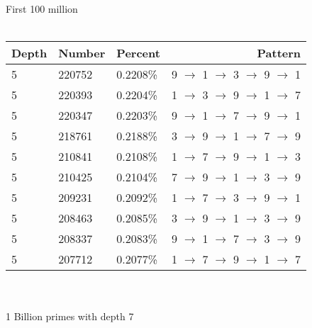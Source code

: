 \documentclass[13pt]{article}
\begin{document}
\\First 100 million\\\\
\begin{tabular}{ l l l r }
  Depth & Number & Percent & Pattern \\
  \hline
  5 & 220752 & 0.2208\% & 9 $\rightarrow$ 1 $\rightarrow$ 3 $\rightarrow$ 9 $\rightarrow$ 1\\
  5 & 220393 & 0.2204\% & 1 $\rightarrow$ 3 $\rightarrow$ 9 $\rightarrow$ 1 $\rightarrow$ 7\\
  5 & 220347 & 0.2203\% & 9 $\rightarrow$ 1 $\rightarrow$ 7 $\rightarrow$ 9 $\rightarrow$ 1\\
  5 & 218761 & 0.2188\% & 3 $\rightarrow$ 9 $\rightarrow$ 1 $\rightarrow$ 7 $\rightarrow$ 9\\
  5 & 210841 & 0.2108\% & 1 $\rightarrow$ 7 $\rightarrow$ 9 $\rightarrow$ 1 $\rightarrow$ 3\\
  5 & 210425 & 0.2104\% & 7 $\rightarrow$ 9 $\rightarrow$ 1 $\rightarrow$ 3 $\rightarrow$ 9\\
  5 & 209231 & 0.2092\% & 1 $\rightarrow$ 7 $\rightarrow$ 3 $\rightarrow$ 9 $\rightarrow$ 1\\
  5 & 208463 & 0.2085\% & 3 $\rightarrow$ 9 $\rightarrow$ 1 $\rightarrow$ 3 $\rightarrow$ 9\\
  5 & 208337 & 0.2083\% & 9 $\rightarrow$ 1 $\rightarrow$ 7 $\rightarrow$ 3 $\rightarrow$ 9\\
  5 & 207712 & 0.2077\% & 1 $\rightarrow$ 7 $\rightarrow$ 9 $\rightarrow$ 1 $\rightarrow$ 7\\
\end{tabular}
\\\\1 Billion primes with depth 7\\\\
\end{document}
